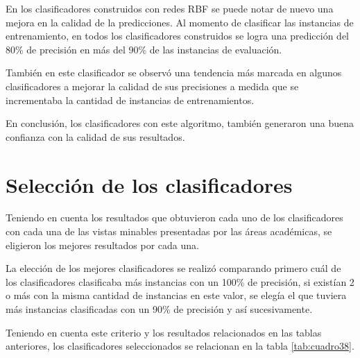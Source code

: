En los clasificadores construidos con redes RBF se puede notar de nuevo una mejora en la calidad de la predicciones. Al momento de clasificar las instancias de entrenamiento, en todos los clasificadores construidos se logra una predicción del 80\% de precisión en más del 90\% de las instancias de evaluación.

También en este clasificador se observó una tendencia más marcada en algunos clasificadores a mejorar la calidad de sus precisiones a medida que se incrementaba la cantidad de instancias de entrenamientos. 

En conclusión, los clasificadores con este algoritmo, también generaron una buena confianza con la calidad de sus resultados.
\section{Selección de los clasificadores}
Teniendo en cuenta los resultados que obtuvieron cada uno de los clasificadores con cada una de las vistas minables presentadas por las áreas académicas, se eligieron los mejores resultados por cada una.

La elección de los mejores clasificadores se realizó comparando primero cuál de los clasificadores clasificaba más instancias con un 100\% de precisión, si existían 2 o más con la misma cantidad de instancias en este valor, se elegía el que tuviera más instancias clasificadas con un 90\% de precisión y así sucesivamente.

Teniendo en cuenta este criterio y los resultados relacionados en las tablas anteriores, los clasificadores seleccionados se relacionan en la tabla \ref{tab:cuadro38}.

